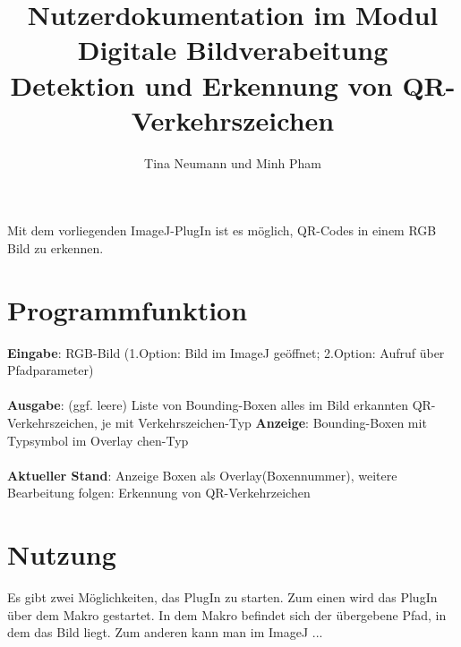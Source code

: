 \documentclass[a4paper,11pt,parskip]{article}
\begin{document}
\title{Nutzerdokumentation im Modul Digitale Bildverabeitung\\  
\textbf{Detektion und Erkennung von QR-Verkehrszeichen}}
\author{Tina Neumann und Minh Pham}

\maketitle

Mit dem vorliegenden ImageJ-PlugIn ist es möglich, QR-Codes in einem RGB Bild zu erkennen.\\

\section{Programmfunktion}

\textbf{Eingabe}: RGB-Bild (1.Option: Bild im ImageJ geöffnet; 2.Option: Aufruf über Pfadparameter)\\ \\
\textbf{Ausgabe}: (ggf. leere) Liste von Bounding-Boxen alles im Bild erkannten QR-Verkehrszeichen, je mit Verkehrszeichen-Typ
\textbf{Anzeige}: Bounding-Boxen mit Typsymbol im Overlay
chen-Typ\\ \\
\textbf{Aktueller Stand}: Anzeige Boxen als Overlay(Boxennummer), weitere Bearbeitung folgen: Erkennung von QR-Verkehrzeichen

\section{Nutzung}
Es gibt zwei Möglichkeiten, das PlugIn zu starten. Zum einen wird das PlugIn über dem Makro gestartet. In dem Makro befindet sich der übergebene Pfad, in dem das Bild liegt. Zum anderen kann man im ImageJ ...
\subsection{}
\end{document}
